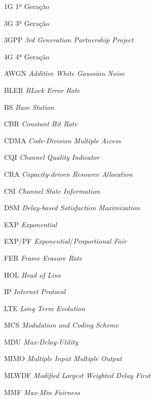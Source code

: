 \begin{siglas}\setlength{\labelwidth}{15ex} \setlength{\itemsep}{0.0001\baselineskip}
  \item[1G] 1ª Geração
  \item[3G] 3ª Geração
  \item[3GPP] \textit{3rd Generation Partnership Project}
  \item[4G] 4ª Geração
  
  \item[AWGN] \textit{Additive White Gaussian Noise}
  
  \item[BLER] \textit{BLock Error Rate}
  \item[BS] \textit{Base Station}
  
  \item[CBR] \textit{Constant Bit Rate}
  \item[CDMA] \textit{Code-Division Multiple Access}
  \item[CQI] \textit{Channel Quality Indicator}
  \item[CRA] \textit{Capacity-driven Resource Allocation}
  \item[CSI] \textit{Channel State Information}
  
  \item[DSM] \textit{Delay-based Satisfaction Maximization}
  
  \item[EXP] \textit{Exponential}
  \item[EXP/PF] \textit{Exponential}/\textit{Proportional Fair}
  
  \item[FER] \textit{Frame Erasure Rate}
  
  \item[HOL] \textit{Head of Line}
  
  \item[IP] \textit{Internet Protocol}
  
  \item[LTE] \textit{Long Term Evolution}
  
  \item[MCS] \textit{Modulation and Coding Scheme}
  \item[MDU] \textit{Max-Delay-Utility}
  \item[MIMO] \textit{Multiple Input Multiple Output}
  \item[MLWDF] \textit{Modified Largest Weighted Delay First}
  \item[MMF] \textit{Max-Min Fairness}
  

\end{siglas}
